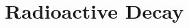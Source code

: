 \hypertarget{group___e_g_x_phys-_radioactive_decay}{}\section{Radioactive Decay}
\label{group___e_g_x_phys-_radioactive_decay}
